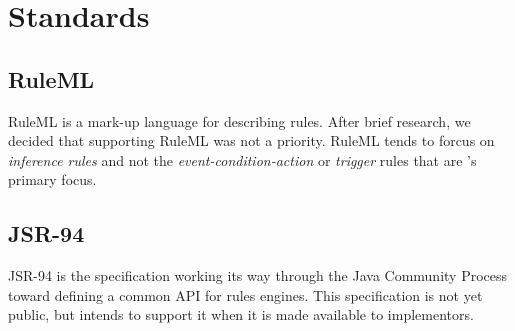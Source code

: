 \section{Standards}

\subsection{RuleML}

RuleML is a mark-up language for describing rules.  After brief
research, we decided that supporting RuleML was not a priority.
RuleML tends to forcus on \emph{inference rules} and not the
\emph{event-condition-action} or \emph{trigger} rules that
are \drools{}'s primary focus.

\subsection{JSR-94}

JSR-94 is the specification working its way through the Java Community
Process toward defining a common API for rules engines.  This
specification is not yet public, but \drools{} intends to support it 
when it is made available to implementors.

